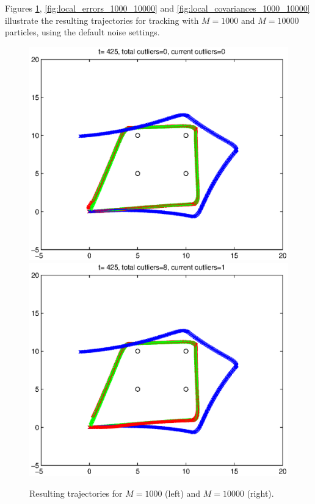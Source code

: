 Figures \ref{fig:local_maps_1000_10000}, \ref{fig:local_errors_1000_10000} and \ref{fig:local_covariances_1000_10000} illustrate the resulting trajectories for
tracking with $M=1000$ and $M=10000$ particles, using the default noise settings.

\begin{figure}
	\centering
	\includegraphics[scale=0.5]{./figures/M=1000/local/1.eps}
	\includegraphics[scale=0.5]{./figures/M=10000/local/1.eps}
	\caption{Resulting trajectories for $M=1000$ (left) and $M=10000$ (right).}
	\label{fig:local_maps_1000_10000}
\end{figure}

